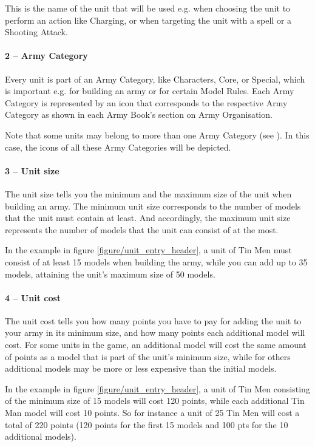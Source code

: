 This is the name of the unit that will be used e.g. when choosing the unit to perform an action like Charging, or when targeting the unit with a spell or a Shooting Attack.

\paragraph{2 -- Army Category}

Every unit is part of an Army Category, like Characters, Core, or Special, which is important e.g. for building an army or for certain Model Rules. Each Army Category is represented by an icon that corresponds to the respective Army Category as shown in each Army Book's section on Army Organisation.

Note that some units may belong to more than one Army Category (see ). In this case, the icons of all these Army Categories will be depicted.

\paragraph{3 -- Unit size}

The unit size tells you the minimum and the maximum size of the unit when building an army. The minimum unit size corresponds to the number of models that the unit must contain at least. And accordingly, the maximum unit size represents the number of models that the unit can consist of at the most.

In the example in figure \ref{figure/unit_entry_header}, a unit of Tin Men must consist of at least 15 models when building the army, while you can add up to 35 models, attaining the unit's maximum size of 50 models.

\columnbreak

\paragraph{4 -- Unit cost}

The unit cost tells you how many points you have to pay for adding the unit to your army in its minimum size, and how many points each additional model will cost. For some units in the game, an additional model will cost the same amount of points as a model that is part of the unit's minimum size, while for others additional models may be more or less expensive than the initial models.

In the example in figure \ref{figure/unit_entry_header}, a unit of Tin Men consisting of the minimum size of 15 models will cost 120 points, while each additional Tin Man model will cost 10 points. So for instance a unit of 25 Tin Men will cost a total of 220 points (120 points for the first 15 models and 100 pts for the 10 additional models).

